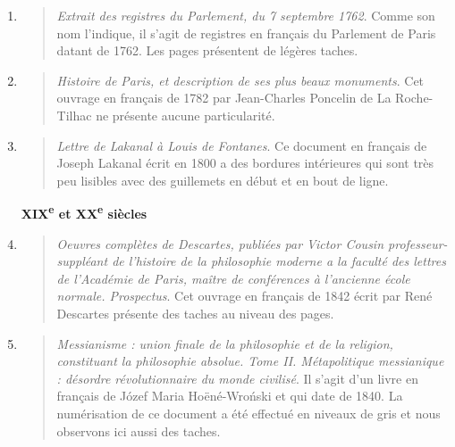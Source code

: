 \documentclass[a4paper,12pt,twoside]{book}
\begin{document}
\begin{enumerate}
\begin{quote}
\end{quote}	
\item
\begin{quote}
	
	\emph{Extrait des registres du Parlement, du 7 septembre 1762}. Comme son nom l'indique, il s'agit de registres en français du Parlement de Paris datant de 1762. Les pages présentent de légères taches.
	
\end{quote}	
\item
\begin{quote}
	
	\emph{Histoire de Paris, et description de ses plus beaux monuments}.
	Cet ouvrage en français de 1782 par Jean-Charles         
	Poncelin de La Roche-Tilhac ne présente aucune particularité.
	
\end{quote}	
\item
\begin{quote}
	
	\emph{Lettre de Lakanal à Louis de Fontanes}.
	Ce document en français de Joseph Lakanal écrit en 1800 a des bordures intérieures qui sont très peu lisibles avec des guillemets en début et en bout de ligne. \\
	
	\end{quote}	

	
	
	\textbf{XIX\textsuperscript{e} et XX\textsuperscript{e} siècles} \\
	

		
	\item
	\begin{quote}
	
	\emph{Oeuvres complètes de Descartes, publiées par Victor Cousin professeur-suppléant de l'histoire de la philosophie moderne a la faculté des lettres de l'Académie de Paris, maître de conférences à l'ancienne école normale. Prospectus}.
	Cet ouvrage en français de 1842 écrit par René Descartes présente des taches au niveau des pages.
	
\end{quote}	
\item
\begin{quote}
	
	\emph{Messianisme : union finale de la philosophie et de la religion, constituant la philosophie absolue. Tome II. Métapolitique messianique : désordre révolutionnaire du monde civilisé}.
	Il s'agit d'un livre en français de Józef Maria Hoëné-Wroński et qui date de 1840. La numérisation de ce document a été effectué en niveaux de gris et nous observons ici aussi des taches.
	

\end{quote}
\end{enumerate}
\end{document}
